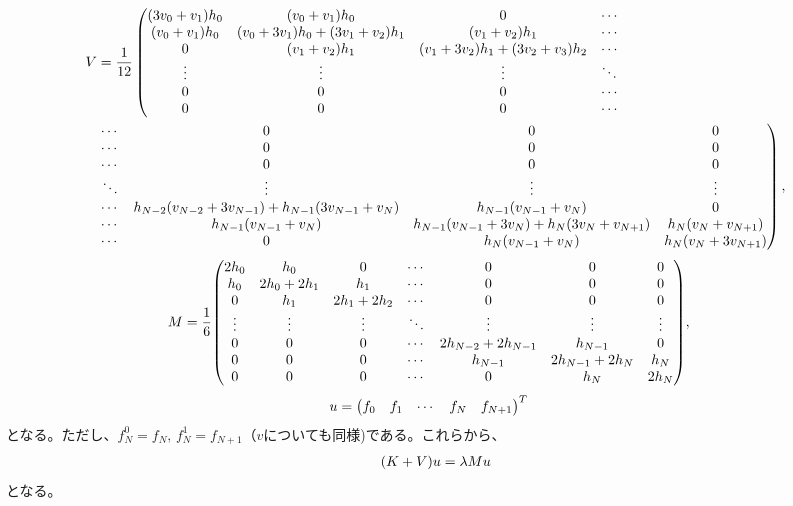 \documentclass[xelatex,ja=standard]{bxjsarticle}
\begin{document}
\begin{align}
     V&= \frac{1}{12}\left(\mqty{
        \qty(3v_{0} +v_{1})h_0 & \qty(v_{0} +v_{1})h_0 & 0 & \cdots \\
        \qty(v_{0} +v_{1})h_0 & \qty(v_{0} + 3v_{1})h_0 + \qty(3v_{1} +v_{2})h_1 & \qty(v_{1} +v_{2})h_1 & \cdots\\
        0 & \qty(v_{1} +v_{2})h_1 & \qty(v_{1} + 3v_{2})h_1 + \qty(3v_{2} + v_{3})h_2 & \cdots\\
        \vdots & \vdots & \vdots & \ddots\\
        0 & 0 & 0 & \cdots\\
        0 & 0 & 0 & \cdots\\
        }\right.\notag\\
     &  \left.\mqty{
        \cdots  & 0 & 0 & 0 \\
        \cdots & 0 & 0 & 0 \\
        \cdots& 0 & 0 & 0 \\
        \ddots  & \vdots& \vdots& \vdots\\
        \cdots & h_{N-2}\qty(v_{N-2} + 3v_{N-1}) + h_{N-1}\qty(3v_{N-1} + v_{N})& h_{N-1}\qty(v_{N - 1} +v_{N})& 0 \\
        \cdots & h_{N-1}\qty(v_{N - 1} +v_{N})& h_{N-1}\qty(v_{N-1} + 3v_{N}) + h_N\qty(3v_{N} + v_{N +1})& h_N\qty(v_{N} +v_{N+1}) \\
        \cdots &0 & h_N\qty(v_{N-1} +v_{N})& h_N\qty(v_{N} +3v_{N+1}) \\
        }\right),
\end{align}
\begin{align}
    M&=
     \frac{1}{6}\mqty(
     2h_0 & h_0 & 0 & \cdots & 0 & 0 & 0 \\
     h_0 & 2h_0 + 2h_1 & h_1 & \cdots & 0 & 0 & 0 \\
     0 & h_1 & 2h_1 + 2h_2 & \cdots & 0 & 0 & 0 \\
     \vdots & \vdots & \vdots & \ddots & \vdots  & \vdots& \vdots\\
     0 & 0 & 0 & \cdots & 2h_{N - 2} + 2h_{N - 1} & h_{N-1}& 0 \\
     0 & 0 & 0 & \cdots & h_{N-1} & 2h_{N - 1} + 2h_{N}& h_{N} \\
     0 & 0 & 0 & \cdots & 0 & h_{N}& 2h_{N} \\
     ),
\end{align}
\begin{align}
    u&=\mqty(f_0 & f_1 & \cdots & f_N & f_{N+1})^T
\end{align}
となる。ただし、$f_N^0 = f_N,\, f_N^1 = f_{N+1}$（$v$についても同様)である。これらから、
\begin{align}
    \qty(K + V) u = \lambda Mu 
\end{align}
となる。
\end{document}
